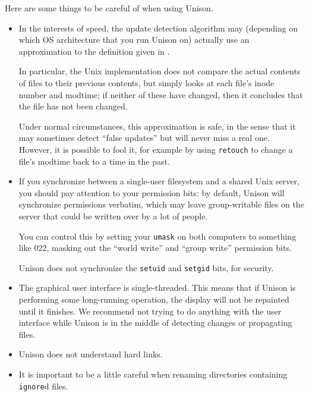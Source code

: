 \documentclass{article}
\begin{document}

Here are some things to be careful of when using Unison.  

\begin{itemize}
\item In the interests of speed, the update detection algorithm may
  (depending on which OS architecture that you run Unison on)
  actually use an approximation to the definition given in
  .  

  In particular, the Unix
  implementation does not compare the actual contents of files to their
  previous contents, but simply looks at each file's inode number and
  modtime; if neither of these have changed, then it concludes that the
  file has not been changed.

  Under normal circumstances, this approximation is safe, in the sense
  that it may sometimes detect ``false updates'' but will never miss a real
  one.  However, it is possible to fool it, for example by using
  \verb|retouch| to change a file's modtime back to a time in the past.

\item If you synchronize between a single-user filesystem and a shared
Unix server, you should pay attention to your permission bits: by
default, Unison will synchronize permissions verbatim, which may leave
group-writable files on the server that could be written over by a lot of
people.  

You can control this by setting your \verb|umask| on both computers to
something like 022, masking out the ``world write'' and ``group write''
permission bits.  

Unison does not synchronize the \verb|setuid| and \verb|setgid| bits, for
security. 

\item The graphical user interface is single-threaded.  This
means that if Unison is performing some long-running operation, the
display will not be repainted until it finishes.  We recommend not
trying to do anything with the user interface while Unison is in the
middle of detecting changes or propagating files.

\item Unison does not understand hard links.

\item It is important to be a little careful when renaming directories
containing {\tt ignore}d files. 


\end{itemize}
\end{document}
